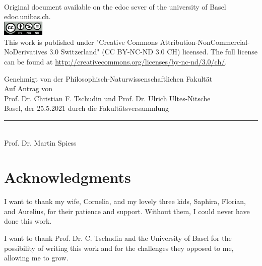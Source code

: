 \begin{titlepage}
\begin{center}
\vfill
{\large \the\year \\[1cm]}
{\footnotesize Original document available on the edoc sever of the university of Basel edoc.unibas.ch.\\[0.5cm]
\includegraphics[height=7mm]{./inc/cclic.png}~\\[0.5cm]
This work is published under  "Creative Commons Attribution-NonCommercial-NoDerivatives 3.0 Switzerland" (CC BY-NC-ND 3.0 CH) licensed. The full license can be found at \url{http://creativecommons.org/licenses/by-nc-nd/3.0/ch/}.
}

\end{center}
\end{titlepage}

\onecolumn
\clearpage\pagestyle{plain}

\begin{center}

Genehmigt von der Philosophisch-Naturwissenschaftlichen Fakult\"at\\
Auf Antrag von\\[0.5cm]
Prof. Dr. Christian F. Tschudin und Prof. Dr. Ulrich Ultes-Nitsche\\[0.5cm]

Basel, der 25.5.2021 durch die Fakultätsversammlung\\[2cm]
{\rule{6cm}{0.2pt}\\ Prof. Dr. Martin Spiess}
\end{center}
\clearpage



\section*{\abstractname}   
\myabstract

\vspace*{\fill}

\section*{Acknowledgments}
I want to thank my wife, Cornelia, and my lovely three kids, Saphira, Florian, and Aurelius, for their patience and support. Without them, I could never have done this work.

I want to thank Prof. Dr. C. Tschudin and the University of Basel for the possibility of writing this work and for the challenges they opposed to me, allowing me to grow. 

